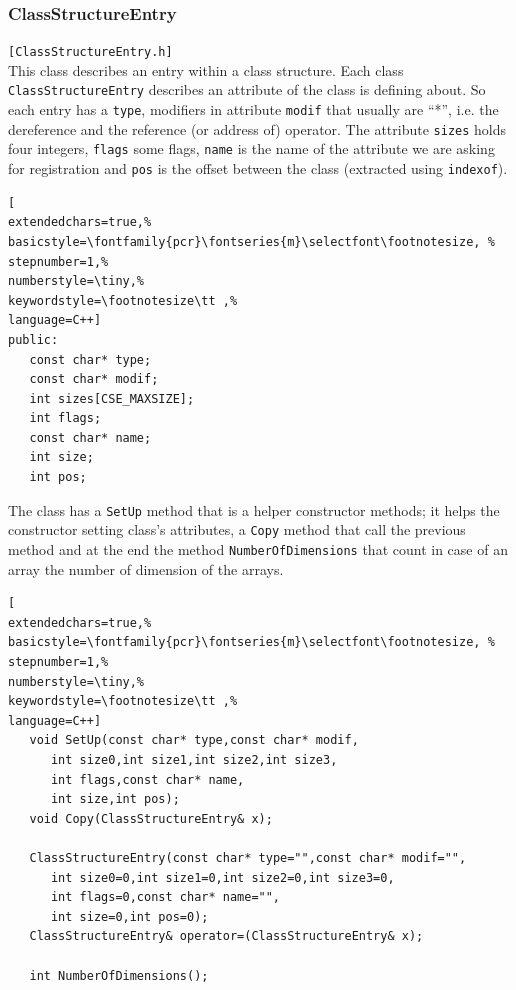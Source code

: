 \subsubsection{ClassStructureEntry}
\texttt{[ClassStructureEntry.h]}\\
This class describes an entry within a class structure. Each class \texttt{ClassStructureEntry} describes an attribute of the class is defining about. So each entry has a \texttt{type}, modifiers in attribute \texttt{modif} that usually are ``*'', i.e. the dereference and the reference (or address of) operator. The attribute \texttt{sizes} holds four integers, \texttt{flags} some flags, \texttt{name} is the name of the attribute we are asking for registration and \texttt{pos} is the offset between the class (extracted using \texttt{indexof}).

\begin{lstlisting}[
extendedchars=true,%
basicstyle=\fontfamily{pcr}\fontseries{m}\selectfont\footnotesize, %
stepnumber=1,%
numberstyle=\tiny,%
keywordstyle=\footnotesize\tt ,%
language=C++]
public:
   const char* type;
   const char* modif;
   int sizes[CSE_MAXSIZE];
   int flags;
   const char* name;
   int size;
   int pos;
\end{lstlisting}

The class has a \texttt{SetUp} method that is a helper constructor methods; it helps the constructor setting class's attributes, a \texttt{Copy} method that call the previous method and at the end the method \texttt{NumberOfDimensions} that count in case of an array the number of dimension of the arrays.

\begin{lstlisting}[
extendedchars=true,%
basicstyle=\fontfamily{pcr}\fontseries{m}\selectfont\footnotesize, %
stepnumber=1,%
numberstyle=\tiny,%
keywordstyle=\footnotesize\tt ,%
language=C++]
   void SetUp(const char* type,const char* modif,
      int size0,int size1,int size2,int size3,
      int flags,const char* name,
      int size,int pos);
   void Copy(ClassStructureEntry& x);

   ClassStructureEntry(const char* type="",const char* modif="",
      int size0=0,int size1=0,int size2=0,int size3=0,
      int flags=0,const char* name="",
      int size=0,int pos=0);
   ClassStructureEntry& operator=(ClassStructureEntry& x);

   int NumberOfDimensions();
\end{lstlisting}



